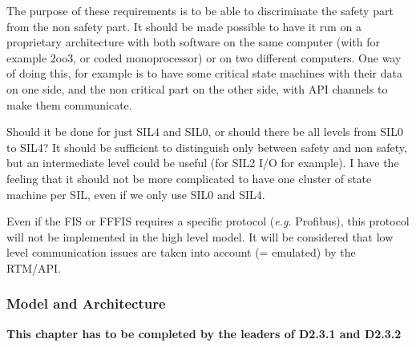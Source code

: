 \documentclass{template/openetcs_article}
\begin{document}

\begin{justif}
The purpose of these requirements is to be able to discriminate the safety part from the non 
safety part. It should be made possible to have it run on a proprietary architecture with both 
software on the same computer (with for example 2oo3, or coded monoprocessor) or on two 
different computers. One way of doing this, for example is to have some critical state 
machines with their data on one side, and the non critical part on the other side, with 
API channels to make them communicate.
\end{justif}

\begin{issue}Should it be done for just SIL4 and SIL0, or should there be all levels from SIL0 
to SIL4? It should be sufficient to distinguish only between safety and non safety, but an 
intermediate level could be useful (for SIL2 I/O for example). I have the feeling that it should not 
be more complicated to have one cluster of state machine per SIL, even if we only use SIL0 and SIL4.
\end{issue}




\begin{justif}
Even if the FIS or FFFIS requires a specific protocol (\emph{e.g.} Profibus), this protocol will not 
be implemented in the high level model. It will be considered that low level communication issues are
taken into account (= emulated) by the RTM/API.
\end{justif}



\subsubsection{Model and Architecture}
\textbf{This chapter has to be completed by the leaders of D2.3.1 and D2.3.2}

\end{document}
